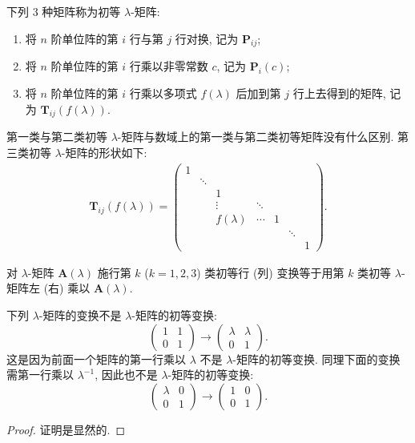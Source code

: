 \documentclass[../../main.tex]{subfiles}
\begin{document}
\begin{definition}[初等$\lambda$-矩阵]
下列 3 种矩阵称为初等 $\lambda$-矩阵:
\begin{enumerate}[(1)]
\item 将 $n$ 阶单位阵的第 $i$ 行与第 $j$ 行对换, 记为 $\boldsymbol{P}_{ij}$;

\item 将 $n$ 阶单位阵的第 $i$ 行乘以非零常数 $c$, 记为 $\boldsymbol{P}_{i}(c)$;

\item 将 $n$ 阶单位阵的第 $i$ 行乘以多项式 $f(\lambda)$ 后加到第 $j$ 行上去得到的矩阵, 记为 $\boldsymbol{T}_{ij}(f(\lambda))$.
\end{enumerate}
\end{definition}
\begin{remark}
第一类与第二类初等 $\lambda$-矩阵与数域上的第一类与第二类初等矩阵没有什么区别. 第三类初等 $\lambda$-矩阵的形状如下:
\begin{align*}
\boldsymbol{T}_{ij}(f(\lambda))=
\begin{pmatrix}
1 & & & & & \\
& \ddots & & & & \\
& & 1 & & & \\
& & \vdots & \ddots & & \\
& & f(\lambda) & \cdots & 1 & \\
& & & & & \ddots & \\
& & & & & & 1
\end{pmatrix}.
\end{align*} 
\end{remark}

\begin{theorem}
对 $\lambda$-矩阵 $\boldsymbol{A}(\lambda)$ 施行第 $k$ ($k = 1,2,3$) 类初等行 (列) 变换等于用第 $k$ 类初等 $\lambda$-矩阵左 (右) 乘以 $\boldsymbol{A}(\lambda)$. 
\end{theorem}
\begin{remark}
下列 $\lambda$-矩阵的变换不是 $\lambda$-矩阵的初等变换:
\[
\begin{pmatrix}
1 & 1 \\
0 & 1
\end{pmatrix}
\rightarrow
\begin{pmatrix}
\lambda & \lambda \\
0 & 1
\end{pmatrix}.
\]
这是因为前面一个矩阵的第一行乘以 $\lambda$ 不是 $\lambda$-矩阵的初等变换. 同理下面的变换需第一行乘以 $\lambda^{-1}$, 因此也不是 $\lambda$-矩阵的初等变换:
\[
\begin{pmatrix}
\lambda & 0 \\
0 & 1
\end{pmatrix}
\rightarrow
\begin{pmatrix}
1 & 0 \\
0 & 1
\end{pmatrix}.
\] 
\end{remark}
\begin{proof}
证明是显然的.
\end{proof}
\end{document}
